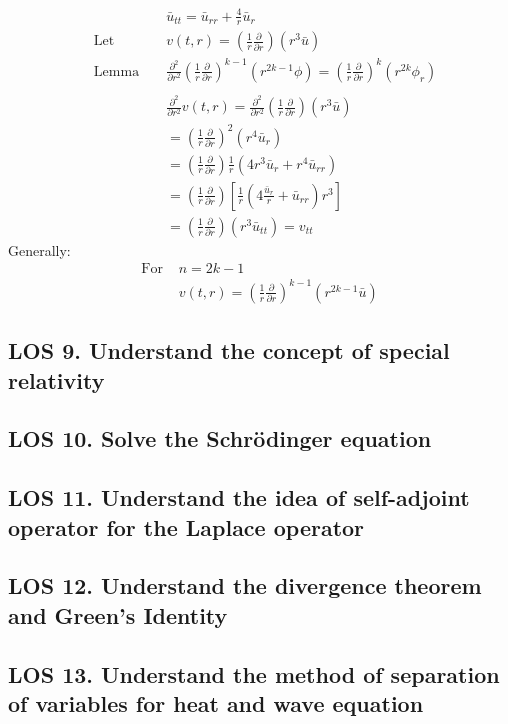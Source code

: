 \documentclass[12pt, a4paper]{article}
\begin{document}
\begin{align*}
    &&&\bar{u}_{tt} = \bar{u}_{rr} + \frac{4}{r}\bar{u}_r\\
    &\text{Let }&&v(t, r) = \left(\frac{1}{r}\frac{\partial}{\partial r}\right)(r^3\bar{u})\\
    &\text{Lemma }&&\frac{\partial^2}{\partial r^2}\left(\frac{1}{r}\frac{\partial}{\partial r}\right)^{k-1}(r^{2k-1}\phi)=\left(\frac{1}{r}\frac{\partial}{\partial r}\right)^{k}(r^{2k}\phi_r)\\\\
    &&&\frac{\partial^2}{\partial r^2}v(t, r) = \frac{\partial^2}{\partial r^2}\left(\frac{1}{r}\frac{\partial}{\partial r}\right)(r^3\bar{u})\\
    &&&=\left(\frac{1}{r}\frac{\partial}{\partial r}\right)^2(r^4\bar{u}_r)\\
    &&&=\left(\frac{1}{r}\frac{\partial}{\partial r}\right)\frac{1}{r}(4r^3\bar{u}_r+r^4\bar{u}_{rr})\\
    &&&=\left(\frac{1}{r}\frac{\partial}{\partial r}\right)\left[\frac{1}{r}(4\frac{\bar{u}_r}{r}+\bar{u}_{rr})r^3\right]\\
    &&&=\left(\frac{1}{r}\frac{\partial}{\partial r}\right)(r^3\bar{u}_{tt}) = v_{tt}
\end{align*}
Generally:
\begin{align*}
    \text{For }&n=2k-1\\
    &v(t, r)=\left(\frac{1}{r}\frac{\partial}{\partial r}\right)^{k-1}(r^{2k-1}\bar{u})
\end{align*}
\vspace{0.3em}

\subsection*{LOS 9. Understand the concept of special relativity}
\vspace{0.3em}

\subsection*{LOS 10. Solve the Schrödinger equation}
\vspace{0.3em}

\subsection*{LOS 11. Understand the idea of self-adjoint operator for the Laplace operator}
\vspace{0.3em}

\subsection*{LOS 12. Understand the divergence theorem and Green's Identity}
\vspace{0.3em}

\subsection*{LOS 13. Understand the method of separation of variables for heat and wave equation}
\vspace{0.3em}
\end{document}
